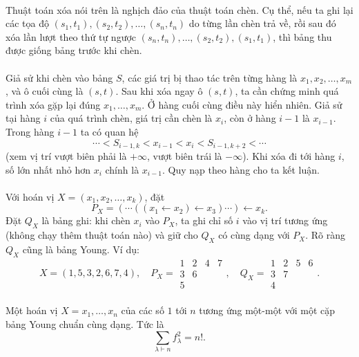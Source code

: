 \documentclass[11pt]{article}
\begin{document}
\paragraph{}
Thuật toán xóa nói trên là nghịch đảo của thuật toán chèn. Cụ thể, nếu ta ghi
lại các tọa độ \((s_1,t_1),(s_2,t_2),\ldots,(s_n,t_n)\) do từng lần chèn trả
về, rồi sau đó xóa lần lượt theo thứ tự ngược
\((s_n,t_n),\ldots,(s_2,t_2),(s_1,t_1)\), thì bảng thu được giống bảng trước
khi chèn.

\paragraph{}
Giả sử khi chèn vào bảng \(S\), các giá trị bị thao tác trên từng hàng là
\(x_1,x_2,\ldots,x_m\), và ô cuối cùng là \((s,t)\). Sau khi xóa ngay ô
\((s,t)\), ta cần chứng minh quá trình xóa gặp lại đúng \(x_1,\ldots,x_m\).
Ở hàng cuối cùng điều này hiển nhiên. Giả sử tại hàng \(i\) của quá trình
chèn, giá trị cần chèn là \(x_i\), còn ở hàng \(i-1\) là \(x_{i-1}\). Trong
hàng \(i-1\) ta có quan hệ
\[
\cdots<S_{i-1,k}<x_{i-1}<x_i<S_{i-1,k+2}<\cdots
\]
(xem vị trí vượt biên phải là \(+\infty\), vượt biên trái là \(-\infty\)).
Khi xóa đi tới hàng \(i\), số lớn nhất nhỏ hơn \(x_i\) chính là
\(x_{i-1}\). Quy nạp theo hàng cho ta kết luận.

\paragraph{}
Với hoán vị \(X=(x_1,x_2,\ldots,x_k)\), đặt
\[
P_X=(\cdots((x_1\leftarrow x_2)\leftarrow x_3)\cdots)\leftarrow x_k.
\]
Đặt \(Q_X\) là bảng ghi: khi chèn \(x_i\) vào \(P_X\), ta ghi chỉ số \(i\) vào
vị trí tương ứng (không chạy thêm thuật toán nào) và giữ cho \(Q_X\) có cùng
dạng với \(P_X\). Rõ ràng \(Q_X\) cũng là bảng Young. Ví dụ:
\[
X=(1,5,3,2,6,7,4),\quad
P_X=\begin{array}{cccc}1&2&4&7\\3&6\\5\end{array},\quad
Q_X=\begin{array}{cccc}1&2&5&6\\3&7\\4\end{array}.
\]

\paragraph{}
Một hoán vị \(X=x_1,\ldots,x_n\) của các số \(1\) tới \(n\) tương ứng một-một
với một cặp bảng Young chuẩn cùng dạng. Tức là
\[
\sum_{\lambda\vdash n} f_\lambda^2=n!.
\]
\end{document}
